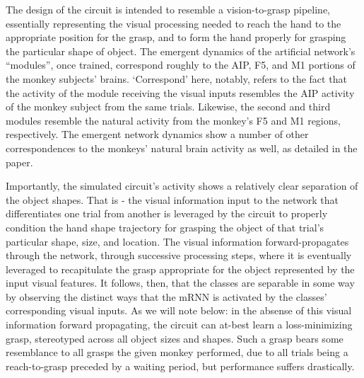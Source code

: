 \documentclass[12pt]{iopart}
\begin{document}
The design of the circuit is intended to resemble a vision-to-grasp pipeline, essentially
representing the visual processing needed to reach the hand to the appropriate position for
the grasp, and to form the hand properly for grasping the particular shape of object. The
emergent dynamics of the artificial network's ``modules'', once trained, correspond roughly
to the AIP, F5, and M1 portions of the monkey subjects' brains. `Correspond' here, notably,
refers to the fact that the activity of the module receiving the visual inputs resembles
the AIP activity of the monkey subject from the same trials. Likewise, the second and
third modules resemble the natural activity from the monkey's F5 and M1 regions, respectively.
The emergent network dynamics show a number of other correspondences to the monkeys' natural
brain activity as well, as detailed in the paper.

Importantly, the simulated circuit's activity shows a relatively clear separation of the
object shapes. That is - the visual information input to the network that differentiates
one trial from another is leveraged by the circuit to properly condition
the hand shape trajectory for grasping the object of that trial's particular shape, size, and
location. The visual information forward-propagates through the network, through successive
processing steps, where it is eventually leveraged to recapitulate the grasp appropriate
for the object represented by the input visual features. It follows, then, that the classes
are separable in some way by observing the distinct ways that the mRNN is activated by the
classes' corresponding visual inputs. As we will note below: in the absense of this
visual information forward propagating, the circuit can at-best learn a loss-minimizing grasp,
stereotyped across all object sizes and shapes. Such a grasp bears some resemblance to all
grasps the given monkey performed, due to all trials being a reach-to-grasp preceded by a
waiting period, but performance suffers drastically.
\end{document}
